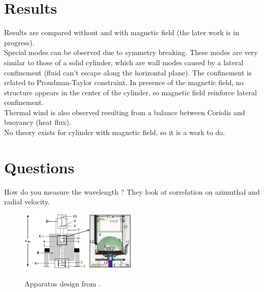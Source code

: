 \documentclass[12pt]{article}
\begin{document}
\section{Results}
Results are compared without and with magnetic field (the later work is in progress).\\
Special modes can be observed due to symmetry breaking. These modes are very similar to those of a solid cylinder, which are wall modes caused by a lateral confinement (fluid can't escape along the horizontal plane). The confinement is related to Proudman-Taylor constraint.  In presence of the magnetic field, no structure appears in the center of the cylinder, so magnetic field reinforce lateral confinement.\\

Thermal wind is also observed resulting from a balance between Coriolis and buoyancy (heat flux).\\

No theory exists for cylinder with magnetic field, so it is a work to do.

\section{Questions}
How do you measure the wavelength ? They look at correlation on azimuthal and radial velocity.





\begin{figure}	
	\centering
	\includegraphics[width=0.5\textwidth]{img/exp.png}\\
	\caption{Apparatus design from \cite{Aujogue2016}. \label{setup} }
\end{figure}



\end{document}
